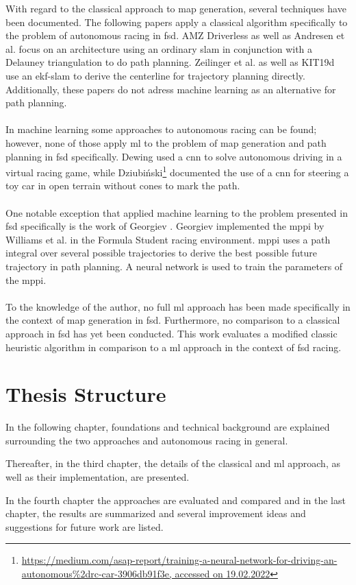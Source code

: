 With regard to the classical approach to map generation, several techniques have been documented. The following papers apply a classical algorithm specifically to the problem of autonomous racing in \ac{fsd}. AMZ Driverless \cite{kabzan2019amz} as well as Andresen et al. \cite{andresen2020} focus on an architecture using an ordinary \ac{slam} in conjunction with a Delauney triangulation to do path planning. Zeilinger et al. \cite{zeilinger2017} as well as KIT19d \cite{nekkah2020} use an \ac{ekf}-\ac{slam} to derive the centerline for trajectory planning directly. Additionally, these papers do not adress machine learning as an alternative for path planning.\\
\\
In machine learning some approaches to autonomous racing can be found; however, none of those apply \ac{ml} to the problem of map generation and path planning in \ac{fsd} specifically. Dewing \cite{DewingNowTI}
used a \ac{cnn} to solve autonomous driving in a virtual racing game, while Dziubiński\footnote{\url{https://medium.com/asap-report/training-a-neural-network-for-driving-an-autonomous\%2drc-car-3906db91f3e, accessed on 19.02.2022}} documented the use of a \ac{cnn} for steering a toy car in open terrain without cones to mark the path.\\
\\
One notable exception that applied machine learning to the problem presented in \ac{fsd} specifically is the work of Georgiev \cite{georgiev2019}. Georgiev implemented the \ac{mppi} by Williams et al. \cite{williams2016} in the Formula Student racing environment. \ac{mppi} uses a path integral over several possible trajectories to derive the best possible future trajectory in path planning. A neural network is used to train the parameters of the \ac{mppi}.\\
\\
To the knowledge of the author, no full \ac{ml} approach has been made specifically in the context of map generation in \ac{fsd}. Furthermore, no comparison to a classical approach in \ac{fsd} has yet been conducted. This work evaluates a modified classic heuristic algorithm in comparison to a \ac{ml} approach in the context of \ac{fsd} racing.

\section{Thesis Structure}
In the following chapter, foundations and technical background are explained surrounding the two approaches and autonomous racing in general.

Thereafter, in the third chapter, the details of the classical and \ac{ml} approach, as well as their implementation, are presented.

In the fourth chapter the approaches are evaluated and compared
and in the last chapter, the results are summarized and several improvement ideas and suggestions for future work are listed.

